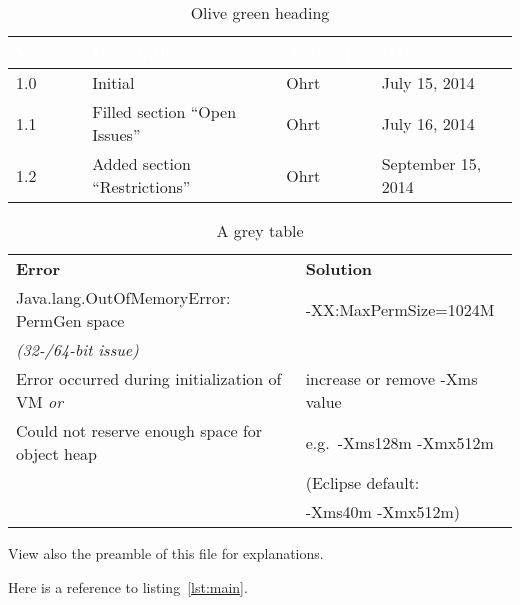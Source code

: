 \begin{center}
	\begin{table}[h]
		\begin{tabular}{|l|l|l|l|}\hline
			\rowcolor{olivegreen30}
			\textcolor{white}{\textbf{Version}}
			&
			\textcolor{white}{\textbf{Description}}	&
			\textcolor{white}{\textbf{Author(s)}}	&
			\textcolor{white}{\textbf{Date}}\\\hline
			1.0		& Initial				& Ohrt					& July 15, 2014\\\hline
			1.1		& Filled section ``Open Issues''	& Ohrt					& July 16, 2014\\\hline
			1.2		& Added section ``Restrictions''	& Ohrt					& September 15, 2014\\\hline
		\end{tabular}
		\caption{Olive green heading} \label{tab:olive}
	\end{table}
	
	\begin{table}[h]
		\begin{tabular}{ l | l }
			\rowcolor{gray20}\textbf{Error}	& \textbf{Solution} \\
			\rowcolor{gray5}Java.lang.OutOfMemoryError: PermGen space
			& -XX:MaxPermSize=1024M \\
			\rowcolor{gray5}\textit{(32-/64-bit issue)}
			& \\
			\rowcolor{gray20}Error occurred during initialization of VM \textit{or}
			& increase or remove -Xms value \\
			\rowcolor{gray20}Could not reserve enough space for object heap
			& e.g.\ -Xms128m -Xmx512m \\
			\rowcolor{gray20}					& \small{(Eclipse default:}\\
			\rowcolor{gray20}					& \small{-Xms40m -Xmx512m)} \\
		\end{tabular}
		\caption{A grey table} \label{tab:grey}
	\end{table}
\end{center}

View also the preamble of this file for explanations.

Here is a reference to listing~\ref{lst:main}.

\chapterend
